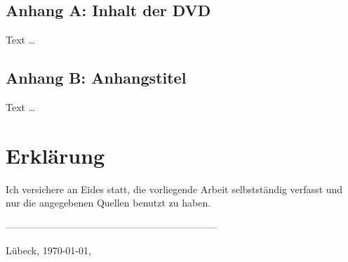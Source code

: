\section*{Anhang A: Inhalt der DVD}
\begin{comment}
Oft ein Default: Was findet man auf der beiliegenden DVD in welchem Verzeichnis? Max. 1 Seite.

\textbf{In jedem Fall} die PDF der Arbeit, den Programmcode, Daten (anonymisiert!).

\textbf{Niemals} Interviewaufzeichnungen, Einverständniserklärungen oder ähnliche personenbezogene Daten auf die DVD brennen — Sie haben in den meisten Fällen Anonymität zugesichert und die DVD ist frei zugänglich (ein Exemplar der Arbeit kommt in die Bibliothek). 
\end{comment}

Text \dots

{}
\section*{Anhang B: Anhangstitel}
\begin{comment}
Weitere Inhalte je nachdem, wo der Leser ohne großen Aufwand hinspringen sollte.
\end{comment}

Text \dots

\clearpage

{}
\chapter*{Erklärung}
Ich versichere an Eides statt, die vorliegende Arbeit selbstständig verfasst und nur die angegebenen Quellen benutzt zu haben.

\begin{comment}
[Nach Ausdruck unterschreiben. Muss auf Papier sein.]
\end{comment}

-----------------------------------------------------------------

Lübeck, \today, \authorMA